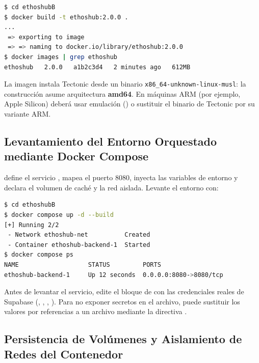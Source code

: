 \begin{lstlisting}[language=bash]
$ cd ethoshubB
$ docker build -t ethoshub:2.0.0 .
...
 => exporting to image
 => => naming to docker.io/library/ethoshub:2.0.0
$ docker images | grep ethoshub
ethoshub   2.0.0   a1b2c3d4   2 minutes ago   612MB
\end{lstlisting}

\begin{AvisoPrecaucion}
La imagen instala Tectonic desde un binario \texttt{x86\_64-unknown-linux-musl}: la
construcción asume arquitectura \textbf{amd64}. En máquinas ARM (por ejemplo, Apple
Silicon) deberá usar emulación () o sustituir el binario
de Tectonic por su variante ARM.
\end{AvisoPrecaucion}

\subsection[Orquestación con Docker Compose]{Levantamiento del Entorno Orquestado mediante Docker Compose}%
\label{subsec:compose}

 define el servicio , mapea el puerto
8080, inyecta las variables de entorno y declara el volumen de caché y la red aislada.
Levante el entorno con:\par

\begin{lstlisting}[language=bash]
$ cd ethoshubB
$ docker compose up -d --build
[+] Running 2/2
 - Network ethoshub-net          Created
 - Container ethoshub-backend-1  Started
$ docker compose ps
NAME                   STATUS         PORTS
ethoshub-backend-1     Up 12 seconds  0.0.0.0:8080->8080/tcp
\end{lstlisting}

\begin{NotaConfiguracion}
Antes de levantar el servicio, edite el bloque  de
 con las credenciales reales de Supabase
(, , ,
). Para no exponer secretos en el archivo, puede sustituir los
valores por referencias a un archivo  mediante la directiva
.
\end{NotaConfiguracion}

\subsection[Volúmenes y Aislamiento de Redes]{Persistencia de Volúmenes y Aislamiento de Redes del Contenedor}%
\label{subsec:volumenes}

